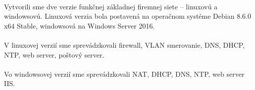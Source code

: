 \paragraph{}
Vytvorili sme dve verzie funkčnej základnej firemnej siete – linuxovú a windowsovú. Linuxová verzia bola postavená na operačnom systéme Debian 8.6.0 x64 Stable, windowsová na Windows Server 2016.
\paragraph{}
V linuxovej verzií sme sprevádzkovali firewall, VLAN smerovanie, DNS, DHCP, NTP, web server, poštový server.
\paragraph{}
Vo windowsovej verzií sme sprevádzkovali NAT, DHCP, DNS, NTP, web server IIS.
